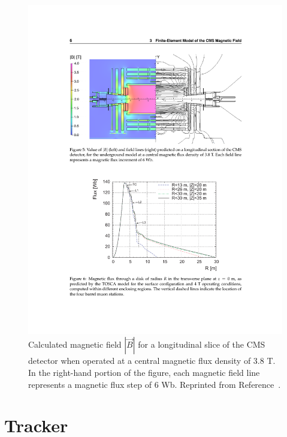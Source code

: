 \begin{figure}[h!]
	\centering
	\includegraphics[width=\linewidth]{Figures/Detector/magnet.pdf}
       \caption[Calculated magnetic field $|\vec{B}|$ for a longitudinal slice of the CMS detector.]{Calculated magnetic field $|\vec{B}|$ for a longitudinal slice of the CMS detector when operated at a central magnetic flux density of 3.8 T. In the right-hand portion of the figure, each magnetic field line represents a magnetic flux step of 6 Wb. Reprinted from Reference~\cite{CMSMagnetField}.}
       \label{fig:magnet}
\end{figure}


\section{Tracker}
\label{sec:Tracker}

